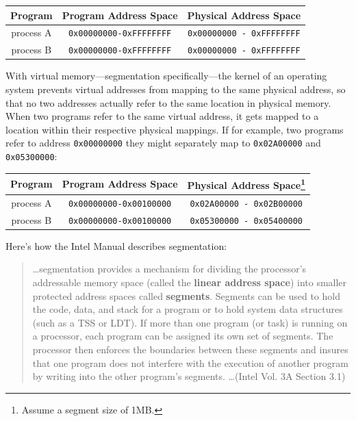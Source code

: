 \documentclass[titlepage]{article}
\begin{document}
\begin{center}
    \begin{tabular}{c c c}
        Program & Program Address Space & Physical Address Space \\
        \hline
        process A & \verb|0x00000000-0xFFFFFFFF| & \verb|0x00000000 - 0xFFFFFFFF| \\
        process B & \verb|0x00000000-0xFFFFFFFF| & \verb|0x00000000 - 0xFFFFFFFF| \\
    \end{tabular}
\end{center}

With virtual memory---segmentation specifically---the kernel of an operating
system prevents virtual addresses from mapping to the same physical address, so
that no two addresses actually refer to the same location in physical memory.
When two programs refer to the same virtual address, it gets mapped to a
location within their respective physical mappings.  If for example, two
programs refer to address \verb|0x00000000| they might separately map to
\verb|0x02A00000| and \verb|0x05300000|:

\begin{center}
    \begin{tabular}{c c c}
        Program & Program Address Space & Physical Address Space\footnote{Assume a
        segment size of 1MB.} \\
        \hline
        process A & \verb|0x00000000-0x00100000| & \verb|0x02A00000 - 0x02B00000| \\
        process B & \verb|0x00000000-0x00100000| & \verb|0x05300000 - 0x05400000| \\
    \end{tabular}
\end{center}

Here's how the Intel Manual describes segmentation:

\begin{quote}\ldots segmentation provides a mechanism for dividing the
    processor's addressable memory space (called the \textbf{linear address space})
    into smaller protected address spaces called \textbf{segments}. Segments can be
    used to hold the code, data, and stack for a program or to hold system data
    structures (such as a TSS or LDT). If more than one program (or task) is running
    on a processor, each program can be assigned its own set of segments. The
    processor then enforces the boundaries between these segments and insures that
    one program does not interfere with the execution of another program by writing
    into the other program's segments. \ldots (Intel Vol. 3A Section 3.1)
\end{quote}
\end{document}
